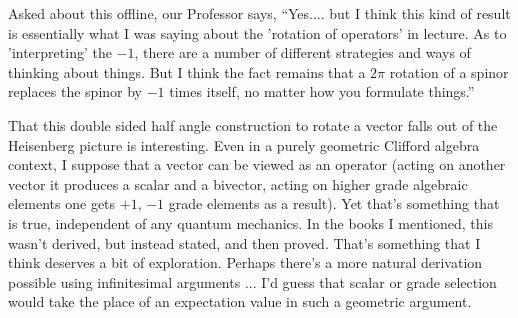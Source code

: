Asked about this offline, our Professor says, ``Yes.... but I think this kind of result is essentially what I was saying about the 'rotation of operators' in lecture.  As to 'interpreting' the $-1$, there are a number of different strategies and ways of thinking about things.  But I think the fact remains that a $2 \pi$ rotation of a spinor replaces the spinor by $-1$ times itself, no matter how you formulate things.''

That this double sided half angle construction to rotate a vector falls out of the Heisenberg picture is interesting.  Even in a purely geometric Clifford algebra context, I suppose that a vector can be viewed as an operator (acting on another vector it produces a scalar and a bivector, acting on higher grade algebraic elements one gets $+1$, $-1$ grade elements as a result).  Yet that's something that is true, independent of any quantum mechanics.  In the books I mentioned, this wasn't derived, but instead stated, and then proved.  That's something that I think deserves a bit of exploration.  Perhaps there's a more natural derivation possible using infinitesimal arguments ... I'd guess that scalar or grade selection would take the place of an expectation value in such a geometric argument.

